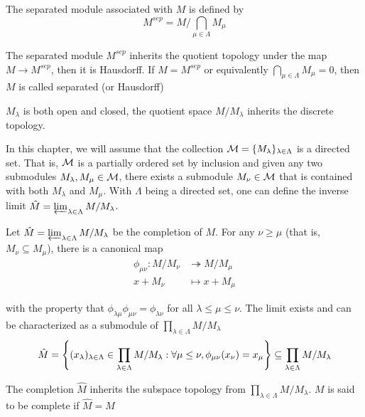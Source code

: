 \begin{definition}
	The separated module associated with $M$ is defined by
	$$
		M^{sep} = M / \bigcap_{\mu \in \Lambda} M_\mu
	$$
	
	The separated module $M^{sep}$ inherits the quotient topology under the map $M \to M^{sep}$, then it is Hausdorff. If $M = M^{sep}$ or equivalently $\bigcap_{\mu \in \Lambda} M_\mu = 0$, then $M$ is called separated (or Hausdorff)
\end{definition}

\begin{remark}
	$M_\lambda$ is both open and closed, the quotient space $M / M_\lambda$ inherits the discrete topology.
\end{remark}

\begin{remark}
	In this chapter, we will assume that the collection $\mc{M} = \set{M_\lambda}_{\lambda \in \Lambda}$ is a directed set. That is, $\mc{M}$ is a partially ordered set by inclusion and given any two submodules $M_\lambda, M_\mu \in \mc{M}$, there exists a submodule $M_\nu \in \mc{M}$ that is contained with both $M_\lambda$ and $M_\mu$. With $\Lambda$ being a directed set, one can define the inverse limit $\hat{M} = \varprojlim_{\lambda \in \Lambda} M / M_\lambda$.
\end{remark}

\begin{definition}
	Let $\hat{M} = \varprojlim_{\lambda \in \Lambda} M / M_\lambda$ be the completion of $M$. For any $\nu \geq \mu$ (that is, $M_\nu \subseteq M_\mu$), there is a canonical map
	\begin{align*}
		\phi_{\mu \nu}: M / M_\nu &\twoheadrightarrow M / M_\mu \\
								x + M_\nu &\mapsto x + M_\mu
	\end{align*}
	
	with the property that $\phi_{\lambda \mu} \phi_{\mu \nu} = \phi_{\lambda \nu}$ for all $\lambda \leq \mu \leq \nu$. The limit exists and can be characterized as a submodule of $\prod_{\lambda \in \Lambda} M / M_\lambda$
	$$
		\hat{M} = \set*{(x_\lambda)_{\lambda \in \Lambda} \in \prod_{\lambda \in \Lambda} M / M_\lambda:  \forall \mu \leq \nu, \phi_{\mu \nu}(x_\nu) = x_\mu} \subseteq \prod_{\lambda \in \Lambda} M / M_\lambda
	$$

	The completion $\hat{M}$ inherits the subspace topology from $\prod_{\lambda \in \Lambda} M / M_\lambda$. $M$ is said to be complete if $\hat{M} = M$
\end{definition}

